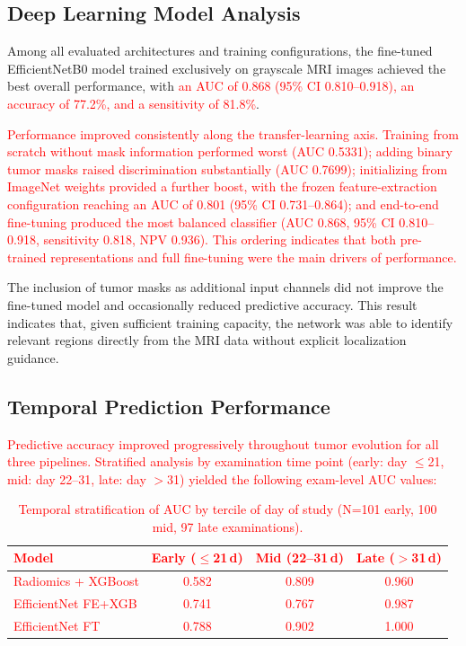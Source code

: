 \documentclass{article}
\begin{document}
\subsection{Deep Learning Model Analysis}

Among all evaluated architectures and training configurations, the fine-tuned EfficientNetB0 model trained exclusively on grayscale MRI images achieved the best overall performance, with \textcolor{red}{an AUC of 0.868 (95\% CI 0.810--0.918), an accuracy of 77.2\%, and a sensitivity of 81.8\%}.

\textcolor{red}{Performance improved consistently along the transfer-learning axis. Training from scratch without mask information performed worst (AUC 0.5331); adding binary tumor masks raised discrimination substantially (AUC 0.7699); initializing from ImageNet weights provided a further boost, with the frozen feature-extraction configuration reaching an AUC of 0.801 (95\% CI 0.731--0.864); and end-to-end fine-tuning produced the most balanced classifier (AUC 0.868, 95\% CI 0.810--0.918, sensitivity 0.818, NPV 0.936). This ordering indicates that both pre-trained representations and full fine-tuning were the main drivers of performance.}

The inclusion of tumor masks as additional input channels did not improve the fine-tuned model and occasionally reduced predictive accuracy. This result indicates that, given sufficient training capacity, the network was able to identify relevant regions directly from the MRI data without explicit localization guidance.

\subsection{Temporal Prediction Performance}

\textcolor{red}{Predictive accuracy improved progressively throughout tumor evolution for all three pipelines. Stratified analysis by examination time point (early: day $\leq$21, mid: day 22--31, late: day $>$31) yielded the following exam-level AUC values:}

\begin{table}[H]
\centering
\textcolor{red}{
\begin{tabular}{lccc}
\hline
Model & Early ($\leq$21\,d) & Mid (22--31\,d) & Late ($>$31\,d) \\
\hline
Radiomics + XGBoost & 0.582 & 0.809 & 0.960 \\
EfficientNet FE+XGB & 0.741 & 0.767 & 0.987 \\
EfficientNet FT      & 0.788 & 0.902 & 1.000 \\
\hline
\end{tabular}
}
\caption{\textcolor{red}{Temporal stratification of AUC by tercile of day of study (N=101 early, 100 mid, 97 late examinations).}}
\label{tab:temporal}
\end{table}
\end{document}
